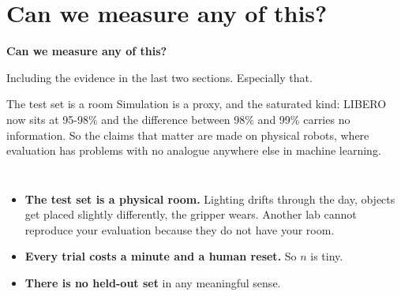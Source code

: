 \documentclass[aspectratio=169]{beamer}
\begin{document}
\section{Can we measure any of this?}

\begin{frame}[plain]
  \vfill
  \begin{center}
    {\Large\color{popblue}\textbf{Can we measure any of this?}}\\[0.9em]
    \begin{minipage}{0.82\textwidth}\centering\small
      Including the evidence in the last two sections. Especially that.
    \end{minipage}
  \end{center}
  \vfill
\end{frame}

\begin{frame}{The test set is a room}
  \small
  Simulation is a proxy, and the saturated kind: LIBERO now sits at 95-98\% and the
  difference between 98\% and 99\% carries no information. So the claims that matter are
  made on physical robots, where evaluation has problems with no analogue anywhere else in
  machine learning.
  \vskip 8pt
  \begin{columns}[T]
    \footnotesize
    \begin{itemize}\itemsep 3pt
      \item \textbf{The test set is a physical room.} Lighting drifts through the day,
        objects get placed slightly differently, the gripper wears. Another lab cannot
        reproduce your evaluation because they do not have your room.
      \item \textbf{Every trial costs a minute and a human reset.} So $n$ is tiny.
      \item \textbf{There is no held-out set} in any meaningful sense.
    \end{itemize}
  \end{columns}
\end{frame}
\end{document}
